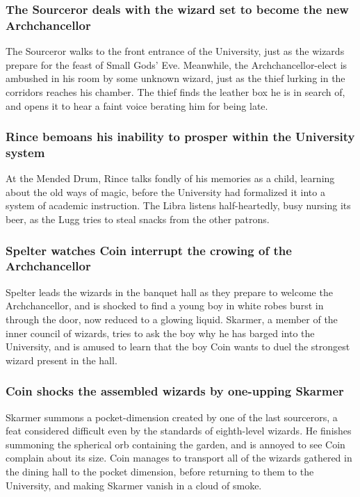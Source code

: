 \subsubsection{The Sourceror deals with the wizard set to become the new Archchancellor}
The Sourceror walks to the front entrance of the University, just as the wizards prepare for the
feast of Small Gods' Eve. Meanwhile, the Archchancellor-elect is ambushed in his room by some
unknown wizard, just as the thief lurking in the corridors reaches his chamber. The thief finds the
leather box he is in search of, and opens it to hear a faint voice berating him for being late.

\subsubsection{\Gls{Rince} bemoans his inability to prosper within the University system}
At the Mended Drum, \Gls{Rince} talks fondly of his memories as a child, learning about the old
ways of magic, before the University had formalized it into a system of academic instruction.
The \Gls{Libra} listens half-heartedly, busy nursing its beer, as the \Gls{Lugg} tries to steal
snacks from the other patrons.

\subsubsection{\Gls{Spelter} watches \Gls{Coin} interrupt the crowing of the Archchancellor}
\Gls{Spelter} leads the wizards in the banquet hall as they prepare to welcome the Archchancellor,
and is shocked to find a young boy in white robes burst in through the door, now reduced to a
glowing liquid. \Gls{Skarmer}, a member of the inner council of wizards, tries to ask the boy why
he has barged into the University, and is amused to learn that the boy \Gls{Coin} wants to duel the
strongest wizard present in the hall.

\subsubsection{\Gls{Coin} shocks the assembled wizards by one-upping \Gls{Skarmer}}
\Gls{Skarmer} summons a pocket-dimension created by one of the last sourcerors, a feat considered
difficult even by the standards of eighth-level wizards. He finishes summoning the spherical
orb containing the garden, and is annoyed to see \Gls{Coin} complain about its size. \Gls{Coin}
manages to transport all of the wizards gathered in the dining hall to the pocket dimension, before
returning to them to the University, and making \Gls{Skarmer} vanish in a cloud of smoke.

